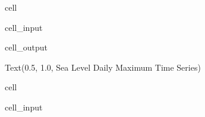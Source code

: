 \documentclass[letterpaper,10pt,english]{jupyterBook}
\begin{document}
\begin{sphinxuseclass}{cell}
\begin{sphinxVerbatimInput}
\begin{sphinxuseclass}{cell_input}
\end{sphinxuseclass}\end{sphinxVerbatimInput}
\begin{sphinxVerbatimOutput}

\begin{sphinxuseclass}{cell_output}
\begin{sphinxVerbatim}[commandchars=\\\{\}]
Text(0.5, 1.0, \PYGZsq{}Sea Level Daily Maximum Time Series\PYGZsq{})
\end{sphinxVerbatim}

\noindent{}

\end{sphinxuseclass}\end{sphinxVerbatimOutput}

\end{sphinxuseclass}
\begin{sphinxuseclass}{cell}\begin{sphinxVerbatimInput}

\begin{sphinxuseclass}{cell_input}
\begin{sphinxVerbatim}[commandchars=\\\{\}]
  \PYG{p}{[}\PYG{p}{]} 
\end{sphinxVerbatim}

\end{sphinxuseclass}\end{sphinxVerbatimInput}

\end{sphinxuseclass}
\end{document}
